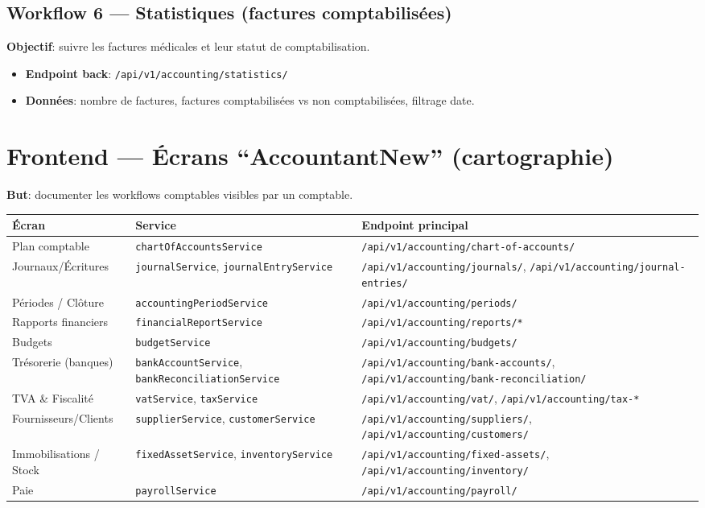 \documentclass[12pt,a4paper]{article}
\begin{document}
\subsection{Workflow 6 --- Statistiques (factures comptabilisées)}
\textbf{Objectif}: suivre les factures médicales et leur statut de comptabilisation.
\begin{itemize}[leftmargin=1.2cm]
  \item \textbf{Endpoint back}: \texttt{/api/v1/accounting/statistics/}
  \item \textbf{Données}: nombre de factures, factures comptabilisées vs non comptabilisées, filtrage date.
\end{itemize}

\section{Frontend --- Écrans “AccountantNew” (cartographie)}
\textbf{But}: documenter les workflows comptables visibles par un comptable.

\begin{longtable}{|p{5.3cm}|p{4.3cm}|p{5.0cm}|}
\hline
\textbf{Écran} & \textbf{Service} & \textbf{Endpoint principal} \\ \hline
Plan comptable & \texttt{chartOfAccountsService} & \texttt{/api/v1/accounting/chart-of-accounts/} \\ \hline
Journaux/Écritures & \texttt{journalService}, \texttt{journalEntryService} & \texttt{/api/v1/accounting/journals/}, \texttt{/api/v1/accounting/journal-entries/} \\ \hline
Périodes / Clôture & \texttt{accountingPeriodService} & \texttt{/api/v1/accounting/periods/} \\ \hline
Rapports financiers & \texttt{financialReportService} & \texttt{/api/v1/accounting/reports/*} \\ \hline
Budgets & \texttt{budgetService} & \texttt{/api/v1/accounting/budgets/} \\ \hline
Trésorerie (banques) & \texttt{bankAccountService}, \texttt{bankReconciliationService} & \texttt{/api/v1/accounting/bank-accounts/}, \texttt{/api/v1/accounting/bank-reconciliation/} \\ \hline
TVA \& Fiscalité & \texttt{vatService}, \texttt{taxService} & \texttt{/api/v1/accounting/vat/}, \texttt{/api/v1/accounting/tax-*} \\ \hline
Fournisseurs/Clients & \texttt{supplierService}, \texttt{customerService} & \texttt{/api/v1/accounting/suppliers/}, \texttt{/api/v1/accounting/customers/} \\ \hline
Immobilisations / Stock & \texttt{fixedAssetService}, \texttt{inventoryService} & \texttt{/api/v1/accounting/fixed-assets/}, \texttt{/api/v1/accounting/inventory/} \\ \hline
Paie & \texttt{payrollService} & \texttt{/api/v1/accounting/payroll/} \\ \hline
\end{longtable}
\end{document}
